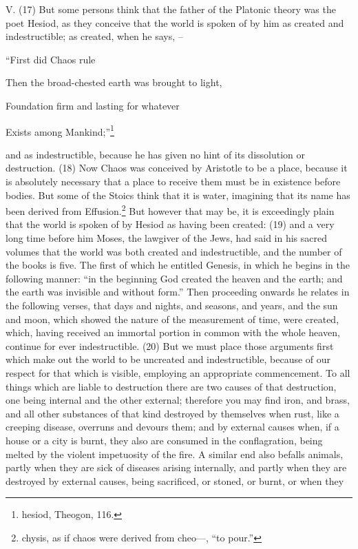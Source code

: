 V. (17) But some persons think that the father of the Platonic theory was the poet Hesiod, as they
conceive that the world is spoken of by him as created and indestructible; as created, when he
says, --

``First did Chaos rule

Then the broad-chested earth was brought to light,

Foundation firm and lasting for whatever

Exists among Mankind;''\footnote{hesiod, Theogon, 116.}

and as indestructible, because he has given no hint of its dissolution or destruction. (18) Now
Chaos was conceived by Aristotle to be a place, because it is absolutely necessary that a place to
receive them must be in existence before bodies. But some of the Stoics think that it is water,
imagining that its name has been derived from Effusion.\footnote{chysis, as if chaos were derived from cheo—, ``to
pour.''} But however that may be, it is exceedingly plain that the world is spoken of by Hesiod as
having been created: (19) and a very long time before him Moses, the lawgiver of the Jews, had
said in his sacred volumes that the world was both created and indestructible, and the number of
the books is five. The first of which he entitled Genesis, in which he begins in the following manner:
``in the beginning God created the heaven and the earth; and the earth was invisible and without
form.'' Then proceeding onwards he relates in the following verses, that days and nights, and
seasons, and years, and the sun and moon, which showed the nature of the measurement of time,
were created, which, having received an immortal portion in common with the whole heaven,
continue for ever indestructible. (20) But we must place those arguments first which make out the
world to be uncreated and indestructible, because of our respect for that which is visible, employing
an appropriate commencement. To all things which are liable to destruction there are two causes
of that destruction, one being internal and the other external; therefore you may find iron, and
brass, and all other substances of that kind destroyed by themselves when rust, like a creeping
disease, overruns and devours them; and by external causes when, if a house or a city is burnt,
they also are consumed in the conflagration, being melted by the violent impetuosity of the fire. A
similar end also befalls animals, partly when they are sick of diseases arising internally, and partly
when they are destroyed by external causes, being sacrificed, or stoned, or burnt, or when they
